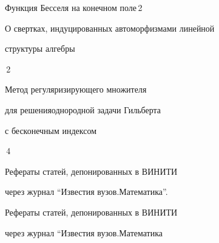 

{Функция Бесселя на конечном поле}{\No\,2}




{О свертках, индуцированных автоморфизмами линейной 


структуры алгебры}{\No\,2}




{Метод регуляризирующего множителя


для решения\newline однородной задачи Гильберта


с бесконечным индексом}{\No\,4}











\noindent{}Рефераты статей, депонированных в ВИНИТИ


через журнал ``Известия вузов.\newline Математика''.





\noindent{}Рефераты статей, депонированных в ВИНИТИ


через журнал ``Известия вузов.\newline Математика





\bigskip

























